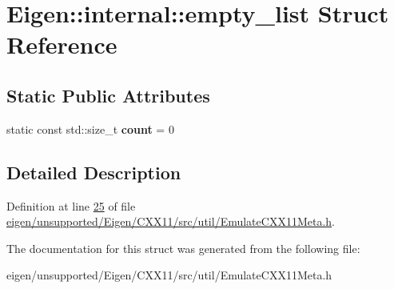 \hypertarget{struct_eigen_1_1internal_1_1empty__list}{}\section{Eigen\+:\+:internal\+:\+:empty\+\_\+list Struct Reference}
\label{struct_eigen_1_1internal_1_1empty__list}
\subsection*{Static Public Attributes}
\begin{DoxyCompactItemize}
\item 
\mbox{\label{struct_eigen_1_1internal_1_1empty__list_aa8bbe76c9cf23d1f41391aa47f8e4356}} 
static const std\+::size\+\_\+t {\bfseries count} = 0
\end{DoxyCompactItemize}


\subsection{Detailed Description}


Definition at line \hyperlink{eigen_2unsupported_2_eigen_2_c_x_x11_2src_2util_2_emulate_c_x_x11_meta_8h_source_l00025}{25} of file \hyperlink{eigen_2unsupported_2_eigen_2_c_x_x11_2src_2util_2_emulate_c_x_x11_meta_8h_source}{eigen/unsupported/\+Eigen/\+C\+X\+X11/src/util/\+Emulate\+C\+X\+X11\+Meta.\+h}.



The documentation for this struct was generated from the following file\+:\begin{DoxyCompactItemize}
\item 
eigen/unsupported/\+Eigen/\+C\+X\+X11/src/util/\+Emulate\+C\+X\+X11\+Meta.\+h\end{DoxyCompactItemize}
